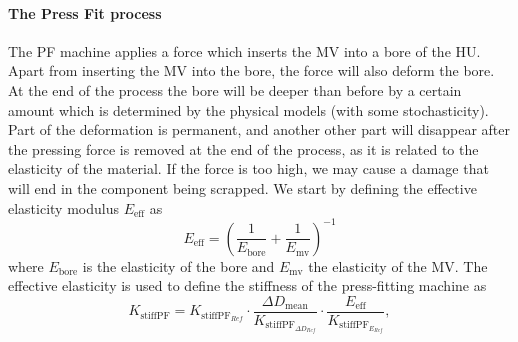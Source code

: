 \paragraph{The Press Fit process}

The PF machine applies a force which inserts the MV into a bore of the HU. Apart from inserting the MV into the bore, the force will also deform the bore. At the end of the process the bore will be deeper than before by a certain amount which is determined by the physical models (with some stochasticity). Part of the deformation is permanent, and another other part will disappear after the pressing force is removed at the end of the process, as it is related to the elasticity of the material. If the force is too high, we may cause a damage that will end in the component being scrapped.
We start by defining the effective elasticity modulus $E_{\text{eff}}$ as
\begin{equation}
    E_{\text{eff}} = \left(\frac{1}{E_{\text{bore}}} + \frac{1}{E_{\text{mv}}}\right)^{-1}
\end{equation}
where $E_{\text{bore}}$ is the elasticity of the bore and $E_{\text{mv}}$ the elasticity of the MV.
The effective elasticity is used to define the stiffness of the press-fitting machine as
\begin{equation} \label{eq:pf_stiffness}
    K_{\text{stiffPF}} = K_{\text{stiffPF}_{Ref}} \cdot \frac{\Delta D_{\text{mean}}}{K_{\text{stiffPF}_{\Delta D_{Ref}}}} \cdot \frac{E_{\text{eff}}}{K_{\text{stiffPF}_{E_{Ref}}}},
\end{equation}

